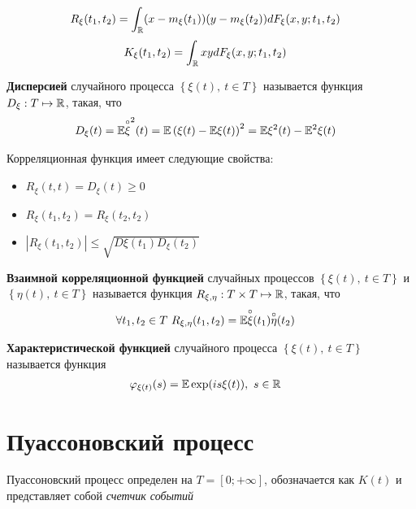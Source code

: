\begin{align*}
  & R_\xi(t_1, t_2) = \int_{\mathbb{R}} (x-m_\xi(t_1))(y-m_\xi(t_2))dF_\xi(x,y;t_1,t_2)
\end{align*}
\begin{align*}
  & K_\xi(t_1, t_2) = \int_{\mathbb{R}} xy dF_\xi(x,y;t_1,t_2)
\end{align*}
\begin{Def}
    \textbf{Дисперсией} случайного процесса $\left\{\xi(t), \ t \in T\right\}$ называется функция $D_\xi: T \mapsto \mathbb{R}$, такая, что
    \begin{align*}
      & D_\xi(t) = \mathbb{E} \overset{\circ}{\xi}^2(t) = \mathbb{E} \left(\xi(t) - \mathbb{E} \xi(t)\right)^2 = \mathbb{E} \xi^2(t) - \mathbb{E}^2 \xi(t)
    \end{align*}
\end{Def}
Корреляционная функция имеет следующие свойства:
\begin{itemize}
    \item $R_\xi(t,t) = D_\xi(t) \geq 0$
    \item $R_\xi(t_1,t_2) = R_\xi(t_2,t_2)$
    \item $\left|R_\xi(t_1,t_2)\right|\leq \sqrt{D\xi(t_1)D_\xi(t_2)}$
\end{itemize}
\begin{Def}
    \textbf{Взаимной корреляционной функцией} случайных процессов $\left\{\xi(t), \ t \in T\right\}$ и $\left\{\eta(t), \ t \in T\right\}$ называется функция $R_{\xi, \eta}: T\times T \mapsto \mathbb{R}$, такая, что
    \begin{align*}
      & \forall t_1, t_2 \in T \ R_{\xi, \eta}(t_1, t_2) = \mathbb{E} \overset{\circ}{\xi}(t_1)\overset{\circ}{\eta}(t_2)
    \end{align*}
\end{Def}
\begin{Def}
    \textbf{Характеристической функцией} случайного процесса $\left\{\xi(t), \ t \in T\right\}$ называется функция
    \begin{align*}
      & \varphi_{\xi(t)}(s) = \mathbb{E} \exp (i s \xi(t)), \ s \in \mathbb{R}
    \end{align*}
\end{Def}
\section{Пуассоновский процесс}
Пуассоновский процесс определен на $T = [0; +\infty]$, обозначается как $K(t)$ и
представляет собой \textit{счетчик событий}